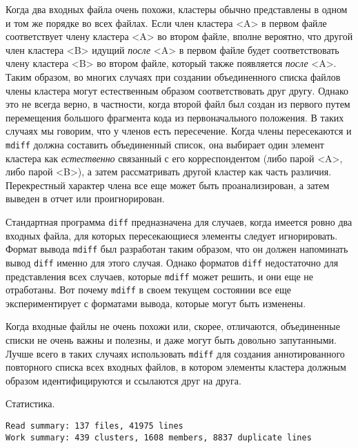 Когда два входных файла очень похожи, кластеры обычно представлены в
одном и том же порядке во всех файлах. Если член кластера
\textless A\textgreater{} в первом файле соответствует члену кластера
\textless A\textgreater{} во втором файле, вполне вероятно, что другой
член кластера \textless B\textgreater{} идущий \emph{после}
\textless A\textgreater{} в первом файле будет соответствовать члену
кластера \textless B\textgreater{} во втором файле, который также
появляется \emph{после} \textless A\textgreater. Таким образом, во
многих случаях при создании объединенного списка файлов члены кластера
могут естественным образом соответствовать друг другу. Однако это не
всегда верно, в частности, когда второй файл был создан из первого путем
перемещения большого фрагмента кода из первоначального положения. В
таких случаях мы говорим, что у членов есть пересечение. Когда члены
пересекаются и \texttt{mdiff} должна составить объединенный список, она
выбирает один элемент кластера как \emph{естественно} связанный с его
корреспондентом (либо парой \textless A\textgreater, либо парой
\textless B\textgreater), а затем рассматривать другой кластер как часть
различия. Перекрестный характер члена все еще может быть
проанализирован, а затем выведен в отчет или проигнорирован.

Стандартная программа \texttt{diff} предназначена для случаев, когда
имеется ровно два входных файла, для которых пересекающиеся элементы
следует игнорировать. Формат вывода \texttt{mdiff} был разработан таким
образом, что он должен напоминать вывод \texttt{diff} именно для этого
случая. Однако форматов \texttt{diff} недостаточно для представления
всех случаев, которые \texttt{mdiff} может решить, и они еще не
отработаны. Вот почему \texttt{mdiff} в своем текущем состоянии все еще
экспериментирует с форматами вывода, которые могут быть изменены.

Когда входные файлы не очень похожи или, скорее, отличаются,
объединенные списки не очень важны и полезны, и даже могут быть довольно
запутанными. Лучше всего в таких случаях использовать \texttt{mdiff} для
создания аннотированного повторного списка всех входных файлов, в
котором элементы кластера должным образом идентифицируются и ссылаются
друг на друга.

Статистика.

\begin{verbatim}
Read summary: 137 files, 41975 lines
Work summary: 439 clusters, 1608 members, 8837 duplicate lines
\end{verbatim}

